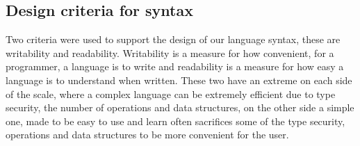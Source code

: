 \subsection{Design criteria for syntax}
Two criteria were used to support the design of our language syntax, these are writability and readability. Writability is a measure for how convenient, for a programmer, a language is to write and readability is a measure for how easy a language is to understand when written. These two have an extreme on each side of the scale, where a complex language can be extremely efficient due to type security, the number of operations and data structures, on the other side a simple one, made to be easy to use and learn often sacrifices some of the type security, operations and data structures to be more convenient for the user.
\begin{comment}
\begin{tabular}{l l l}
$< \texttt{if\_stmt}>$ & $\rightarrow$ $ \textbf{\texttt{if}} \; ( < \texttt{expression} > ) \;  < \texttt{statement} > \; [ \textbf{\texttt{else}} \; < \texttt{statement} > ]$
\end{tabular}

With use of \ac{bnf} the statement would be desriped \\

\begin{tabular}{l l l}
$< \texttt{if\_stmt}>$ & $\rightarrow$ &  $\textbf{\texttt{if}}  \; ( < \texttt{expression} > ) \;  < \texttt{statement} >$ \\
 & $|$ & $ \textbf{\texttt{if}} \; ( < \texttt{expression} > ) \;  < \texttt{statement} > \; \textbf{\texttt{else}} \; < \texttt{statement} > $
\end{tabular}
\end{comment}
